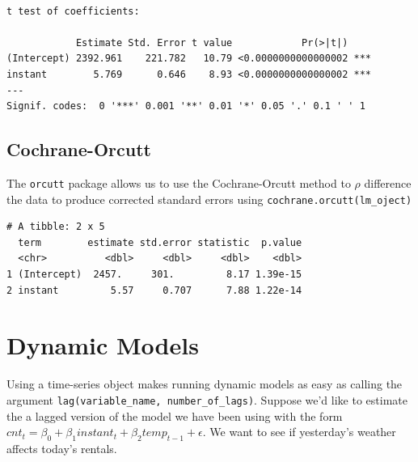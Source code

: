 \documentclass[]{book}
\newenvironment{Shaded}{\begin{snugshade}}{\end{snugshade}}
\newcommand{\DecValTok}[1]{\textcolor[rgb]{0.00,0.00,0.81}{#1}}
\newcommand{\KeywordTok}[1]{\textcolor[rgb]{0.13,0.29,0.53}{\textbf{#1}}}
\newcommand{\NormalTok}[1]{#1}
\newcommand{\OperatorTok}[1]{\textcolor[rgb]{0.81,0.36,0.00}{\textbf{#1}}}
\newcommand{\StringTok}[1]{\textcolor[rgb]{0.31,0.60,0.02}{#1}}
\begin{document}
\begin{verbatim}

t test of coefficients:

            Estimate Std. Error t value            Pr(>|t|)    
(Intercept) 2392.961    221.782   10.79 <0.0000000000000002 ***
instant        5.769      0.646    8.93 <0.0000000000000002 ***
---
Signif. codes:  0 '***' 0.001 '**' 0.01 '*' 0.05 '.' 0.1 ' ' 1
\end{verbatim}

\hypertarget{cochrane-orcutt}{%
\subsection{Cochrane-Orcutt}\label{cochrane-orcutt}}

The \texttt{orcutt} package allows us to use the Cochrane-Orcutt method to \(\rho\) difference the data to produce corrected standard errors using \texttt{cochrane.orcutt(lm\_oject)}

\begin{Shaded}
\end{Shaded}

\begin{verbatim}
# A tibble: 2 x 5
  term        estimate std.error statistic  p.value
  <chr>          <dbl>     <dbl>     <dbl>    <dbl>
1 (Intercept)  2457.     301.         8.17 1.39e-15
2 instant         5.57     0.707      7.88 1.22e-14
\end{verbatim}

\hypertarget{dynamic-models}{%
\section{Dynamic Models}\label{dynamic-models}}

Using a time-series object makes running dynamic models as easy as calling the argument \texttt{lag(variable\_name,\ number\_of\_lags)}. Suppose we'd like to estimate the a lagged version of the model we have been using with the form \(cnt_t=\beta_0+\beta_1instant_t+\beta_2temp_{t-1}+\epsilon\). We want to see if yesterday's weather affects today's rentals.

\begin{Shaded}
\end{Shaded}
\end{document}

